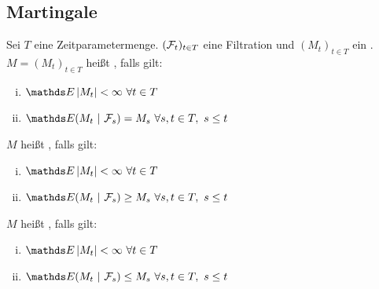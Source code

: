 \subsection{Martingale}
\label{sub:martingale}
Sei $T$ eine Zeitparametermenge. 
$(\mathcal{F}_t)_{t\in T}$ eine Filtration und $(M_t)_{t\in T}$ ein .\\
$M=(M_t)_{t \in T}$ heißt , falls gilt:
\begin{enumerate}[(i)]
	\item $\E\abs{M_t}<\infty~\forall t\in T$
	\item $\E(M_t~|~\F_s)=M_s~\forall s,t\in T,~s\le t$
\end{enumerate}
$M$ heißt , falls gilt:
\begin{enumerate}[(i)]
	\item $\E\abs{M_t}<\infty~\forall t\in T$
	\item $\E(M_t~|~\F_s)\ge M_s~\forall s,t\in T,~s\le t$
\end{enumerate}
$M$ heißt , falls gilt:
\begin{enumerate}[(i)]
	\item $\E\abs{M_t}<\infty~\forall t\in T$
	\item $\E(M_t~|~\F_s)\le M_s~\forall s,t\in T,~s\le t$
\end{enumerate}

